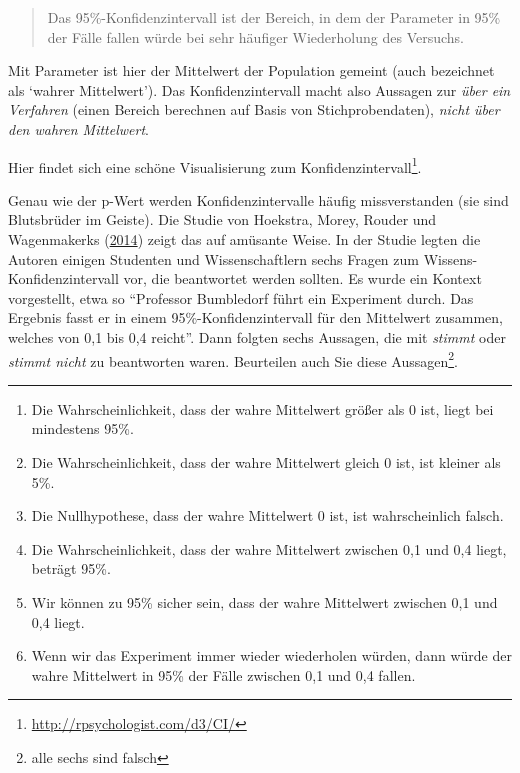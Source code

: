 \documentclass[12pt,ngerman,]{book}
\providecommand{\tightlist}{%
  \setlength{\itemsep}{0pt}\setlength{\parskip}{0pt}}
\let\rmarkdownfootnote\footnote%
\def\footnote{\protect\rmarkdownfootnote}
\renewcommand{\href}[2]{#2\footnote{\url{#1}}}
\theoremstyle{definition}
\theoremstyle{definition}
\theoremstyle{remark}
\begin{document}
\begin{quote}
Das 95\%-Konfidenzintervall ist der Bereich, in dem der Parameter in
95\% der Fälle fallen würde bei sehr häufiger Wiederholung des Versuchs.
\end{quote}

Mit Parameter ist hier der Mittelwert der Population gemeint (auch
bezeichnet als `wahrer Mittelwert'). Das Konfidenzintervall macht also
Aussagen zur \emph{über ein Verfahren} (einen Bereich berechnen auf
Basis von Stichprobendaten), \emph{nicht über den wahren Mittelwert}.

Hier findet sich eine schöne
\href{http://rpsychologist.com/d3/CI/}{Visualisierung zum
Konfidenzintervall}.

Genau wie der p-Wert werden Konfidenzintervalle häufig missverstanden
(sie sind Blutsbrüder im Geiste). Die Studie von Hoekstra, Morey, Rouder
und Wagenmakerks (\protect\hyperlink{ref-hoekstra2014robust}{2014})
zeigt das auf amüsante Weise. In der Studie legten die Autoren einigen
Studenten und Wissenschaftlern sechs Fragen zum
Wissens-Konfidenzintervall vor, die beantwortet werden sollten. Es wurde
ein Kontext vorgestellt, etwa so ``Professor Bumbledorf führt ein
Experiment durch. Das Ergebnis fasst er in einem 95\%-Konfidenzintervall
für den Mittelwert zusammen, welches von 0,1 bis 0,4 reicht''. Dann
folgten sechs Aussagen, die mit \emph{stimmt} oder \emph{stimmt nicht}
zu beantworten waren. Beurteilen auch Sie diese Aussagen\footnote{alle
  sechs sind falsch}.

\begin{center}\rule{0.5\linewidth}{\linethickness}\end{center}

\begin{enumerate}
\def\labelenumi{\arabic{enumi}.}
\tightlist
\item
  Die Wahrscheinlichkeit, dass der wahre Mittelwert größer als 0 ist,
  liegt bei mindestens 95\%.
\item
  Die Wahrscheinlichkeit, dass der wahre Mittelwert gleich 0 ist, ist
  kleiner als 5\%.
\item
  Die Nullhypothese, dass der wahre Mittelwert 0 ist, ist wahrscheinlich
  falsch.
\item
  Die Wahrscheinlichkeit, dass der wahre Mittelwert zwischen 0,1 und 0,4
  liegt, beträgt 95\%.
\item
  Wir können zu 95\% sicher sein, dass der wahre Mittelwert zwischen 0,1
  und 0,4 liegt.
\item
  Wenn wir das Experiment immer wieder wiederholen würden, dann würde
  der wahre Mittelwert in 95\% der Fälle zwischen 0,1 und 0,4 fallen.
\end{enumerate}
\end{document}
